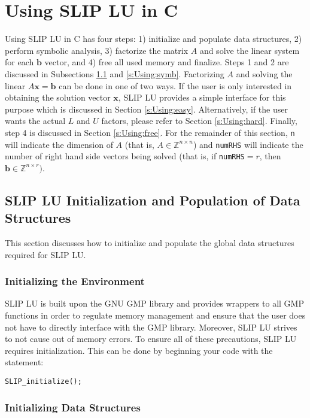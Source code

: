 \documentclass[12pt]{article}
\theoremstyle{definition}
\begin{document}
\cprotect\section{Using SLIP LU in C} \label{s:Using}

Using SLIP LU in C has four steps: 1) initialize and populate data structures, 2) perform symbolic analysis, 3) factorize the matrix $A$ and solve the linear system for each $\mathbf{b}$ vector, and 4) free all used memory and finalize. Steps 1 and 2 are discussed in Subsections \ref{s:Using:init} and \ref{s:Using:symb}. Factorizing $A$ and solving the linear $A \mathbf{x} = \mathbf{b}$ can be done in one of two ways. If the user is only interested in obtaining the solution vector $\mathbf{x}$, SLIP LU provides a simple interface for this purpose which is discussed in Section \ref{s:Using:easy}. Alternatively, if the user wants the actual $L$ and $U$ factors, please refer to Section \ref{s:Using:hard}. Finally, step 4 is discussed in Section \ref{s:Using:free}. For the remainder of this section, \verb|n| will indicate the dimension of $A$ (that is, $A \in \mathbb{Z}^{n \times n}$) and \verb|numRHS| will indicate the number of right hand side vectors being solved (that is, if \verb|numRHS|$= r$, then $\mathbf{b} \in \mathbb{Z}^{n \times r})$.

\cprotect\subsection{SLIP LU Initialization and Population of Data Structures} \label{s:Using:init}

This section discusses how to initialize and populate the global data structures required for SLIP LU.

\subsubsection{Initializing the Environment}

SLIP LU is built upon the GNU GMP library \cite{granlund2015gnu} and provides wrappers to all GMP functions in order to regulate memory management and ensure that the user does not have to directly interface with the GMP library. Moreover, SLIP LU strives to not cause out of memory errors. To ensure all of these precautions, SLIP LU requires initialization. This can be done by beginning your code with the statement:

\verb|SLIP_initialize();|

\subsubsection{Initializing Data Structures}
\end{document}
